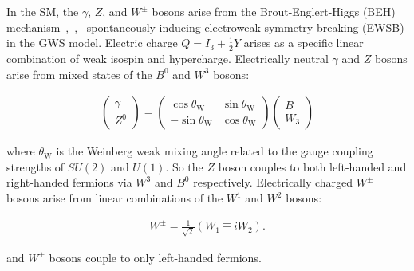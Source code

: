 \begin{refsection}
In the SM, the $\gamma$, $Z$, and $W^\pm$ bosons arise from the Brout-Englert-Higgs (BEH) mechanism~\cite{HIGGS1964132},~\cite{PhysRevLett.13.508},~\cite{PhysRevLett.13.321} spontaneously inducing electroweak symmetry breaking (EWSB) in the GWS model.
Electric charge $Q = I_3 + \frac{1}{2} Y$ arises as a specific linear combination of weak isospin and hypercharge.
Electrically neutral $\gamma$ and $Z$ bosons arise from mixed states of the $B^0$ and $W^3$ bosons:
\begin{linenomath*}
\begin{align}
\left(\begin{array}{c}
\gamma \\
Z^0
\end{array}\right)=\left(\begin{array}{cc}
\cos \theta_{\mathrm{W}} & \sin \theta_{\mathrm{W}} \\
-\sin \theta_{\mathrm{W}} & \cos \theta_{\mathrm{W}}
\end{array}\right)\left(\begin{array}{c}
B \\
W_3
\end{array}\right)
\label{}
\end{align}
\end{linenomath*}
where $\theta_{\mathrm{W}}$ is the Weinberg weak mixing angle related to the gauge coupling strengths of $SU(2)$ and $U(1)$.
So the $Z$ boson couples to both left-handed and right-handed fermions via $W^3$ and $B^0$ respectively.
Electrically charged $W^\pm$ bosons arise from linear combinations of the $W^1$ and $W^2$ bosons:
\begin{linenomath*}
\begin{align}
W^{\pm}=\frac{1}{\sqrt{2}}\left(W_1 \mp i W_2\right).
\end{align}
\end{linenomath*}
and $W^\pm$ bosons couple to only left-handed fermions.


\end{refsection}
